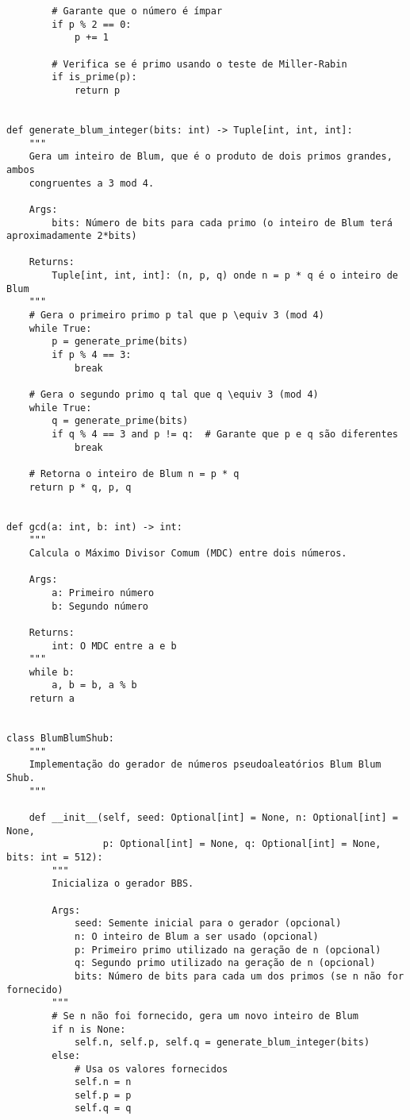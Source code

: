\begin{verbatim}
        # Garante que o número é ímpar
        if p % 2 == 0:
            p += 1
        
        # Verifica se é primo usando o teste de Miller-Rabin
        if is_prime(p):
            return p


def generate_blum_integer(bits: int) -> Tuple[int, int, int]:
    """
    Gera um inteiro de Blum, que é o produto de dois primos grandes, ambos
    congruentes a 3 mod 4.
    
    Args:
        bits: Número de bits para cada primo (o inteiro de Blum terá aproximadamente 2*bits)
        
    Returns:
        Tuple[int, int, int]: (n, p, q) onde n = p * q é o inteiro de Blum
    """
    # Gera o primeiro primo p tal que p \equiv 3 (mod 4)
    while True:
        p = generate_prime(bits)
        if p % 4 == 3:
            break
    
    # Gera o segundo primo q tal que q \equiv 3 (mod 4)
    while True:
        q = generate_prime(bits)
        if q % 4 == 3 and p != q:  # Garante que p e q são diferentes
            break
    
    # Retorna o inteiro de Blum n = p * q
    return p * q, p, q


def gcd(a: int, b: int) -> int:
    """
    Calcula o Máximo Divisor Comum (MDC) entre dois números.
    
    Args:
        a: Primeiro número
        b: Segundo número
        
    Returns:
        int: O MDC entre a e b
    """
    while b:
        a, b = b, a % b
    return a


class BlumBlumShub:
    """
    Implementação do gerador de números pseudoaleatórios Blum Blum Shub.
    """
    
    def __init__(self, seed: Optional[int] = None, n: Optional[int] = None, 
                 p: Optional[int] = None, q: Optional[int] = None, bits: int = 512):
        """
        Inicializa o gerador BBS.
        
        Args:
            seed: Semente inicial para o gerador (opcional)
            n: O inteiro de Blum a ser usado (opcional)
            p: Primeiro primo utilizado na geração de n (opcional)
            q: Segundo primo utilizado na geração de n (opcional)
            bits: Número de bits para cada um dos primos (se n não for fornecido)
        """
        # Se n não foi fornecido, gera um novo inteiro de Blum
        if n is None:
            self.n, self.p, self.q = generate_blum_integer(bits)
        else:
            # Usa os valores fornecidos
            self.n = n
            self.p = p
            self.q = q
        

\end{verbatim}
